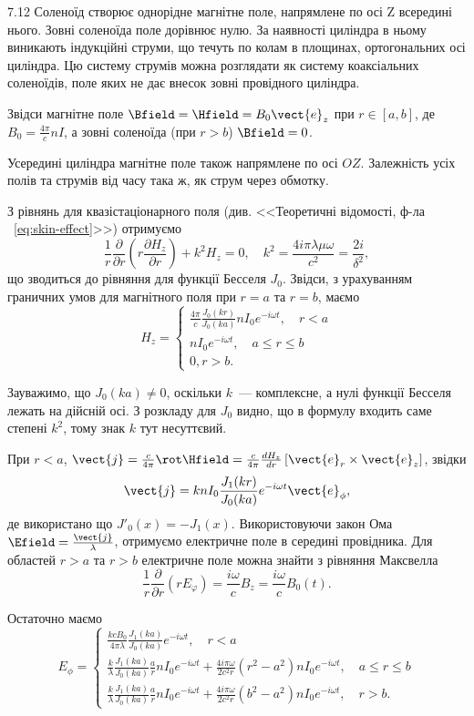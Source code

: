 \begin{Solution}{7.{12}}
	Соленоїд створює однорідне магнітне поле, напрямлене по осі Z  всередині нього. Зовні соленоїда поле дорівнює нулю. За наявності циліндра в ньому виникають індукційні струми, що течуть по колам в площинах, ортогональних осі циліндра. Цю систему струмів можна розглядати як систему коаксіальних соленоїдів, поле яких не дає внесок зовні провідного  циліндра.

	Звідси магнітне поле $\Bfield = \Hfield = B_0\vect{e}_z$ при $r \in [a,b]$, де $B_0 = \frac{4\pi}{c}nI$, а зовні соленоїда (при $r > b$) $\Bfield = 0$.

	Усередині циліндра магнітне поле також напрямлене по осі $OZ$. Залежність усіх полів та струмів від часу така ж, як струм через обмотку.

	З рівнянь для квазістаціонарного поля (див. <<Теоретичні відомості, ф-ла ~\eqref{eq:skin-effect}>>) отримуємо
	\[
		\frac{1}{r}\frac{\partial }{{\partial r}}\left( {r\frac{{\partial {H_z}}}{{\partial r}}} \right) + {k^2}{H_z} = 0, \quad k^2 = \frac{4i\pi\lambda\mu\omega}{c^2} = \frac{2i}{\delta^2},
	\]
	що зводиться до рівняння для функції Бесселя $J_0$. Звідси, з урахуванням граничних умов для магнітного поля при $r = a$  та $r = b$, маємо
	\[H_z =
		\begin{cases}
			\frac{4\pi}{c}\frac{J_0(kr)}{J_0(ka)}nI_0e^{-i\omega t}, \quad r <a \\
			nI_0e^{-i\omega t}, \quad a \le r \le b                             \\
			0, r > b.
		\end{cases}
	\]

	Зауважимо, що $J_0(ka) \neq 0$, оскільки  $k$~--- комплексне, а нулі функції Бесселя лежать на дійсній осі.  З розкладу для  $J_0$  видно, що в формулу входить саме степені $k^2$, тому знак $k$ тут несуттєвий.

	При $r < a$, $\vect{j} = \frac{c}{4\pi}\rot\Hfield = \frac{c}{4\pi}\frac{d{H_z}}{dr}\left[ \vect{e}_r \times \vect{e}_z \right]$, звідки
	\[
		\vect{j} = knI_0\frac{J_1(kr)}{J_0(ka)}e^{-i\omega t}\vect{e}_{\phi},
	\]
	де використано що $J'_0(x) = -J_1(x)$. Використовуючи закон Ома $\Efield = \frac{\vect{j}}{\lambda}$, отримуємо електричне поле в середині провідника.
	Для областей $r >a$ та $r >b$ електричне поле можна знайти з рівняння Максвелла
	\[
		\frac{1}{r}\frac{\partial }{{\partial r}}\left( {r{E_\varphi }} \right) = \frac{{i\omega }}{c}{B_z} = \frac{{i\omega }}{c}{B_0}(t).
	\]

	Остаточно маємо
	\[
		E_{\phi} =
		\begin{cases}
			\frac{kcB_0}{4\pi\lambda}\frac{J_1(ka)}{J_0(ka)}e^{-i\omega t}, \quad r <a                                                                                        \\
			\frac{k}{\lambda}\frac{J_1(ka)}{J_0(ka)}\frac{a}{r}nI_0e^{-i\omega t} + \frac{4i\pi\omega }{2c^2r}\left( r^2 - a^2\right) nI_0e^{-i\omega t}, \quad a \le r \le b \\
			\frac{k}{\lambda}\frac{J_1(ka)}{J_0(ka)}\frac{a}{r}nI_0e^{-i\omega t} + \frac{4i\pi\omega }{2c^2r}\left( b^2 - a^2\right)nI_0e^{-i\omega t} , \quad r > b.
		\end{cases}
	\]
\end{Solution}
